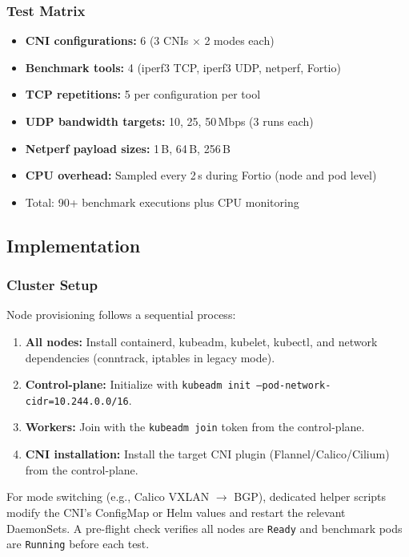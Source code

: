 \documentclass[11pt,a4paper]{article}
\begin{document}
\subsubsection{Test Matrix}

\begin{itemize}[nosep]
  \item \textbf{CNI configurations:} 6 (3 CNIs $\times$ 2 modes each)
  \item \textbf{Benchmark tools:} 4 (iperf3 TCP, iperf3 UDP, netperf, Fortio)
  \item \textbf{TCP repetitions:} 5 per configuration per tool
  \item \textbf{UDP bandwidth targets:} 10, 25, 50\,Mbps (3 runs each)
  \item \textbf{Netperf payload sizes:} 1\,B, 64\,B, 256\,B
  \item \textbf{CPU overhead:} Sampled every 2\,s during Fortio (node and pod level)
  \item Total: 90+ benchmark executions plus CPU monitoring
\end{itemize}

\subsection{Implementation}

\subsubsection{Cluster Setup}

Node provisioning follows a sequential process:
\begin{enumerate}
  \item \textbf{All nodes:} Install containerd, kubeadm, kubelet, kubectl, and network dependencies (conntrack, iptables in legacy mode).
  \item \textbf{Control-plane:} Initialize with \texttt{kubeadm init --pod-network-cidr=10.244.0.0/16}.
  \item \textbf{Workers:} Join with the \texttt{kubeadm join} token from the control-plane.
  \item \textbf{CNI installation:} Install the target CNI plugin (Flannel/Calico/Cilium) from the control-plane.
\end{enumerate}

For mode switching (e.g., Calico VXLAN $\to$ BGP), dedicated helper scripts modify the CNI's ConfigMap or Helm values and restart the relevant DaemonSets. A pre-flight check verifies all nodes are \texttt{Ready} and benchmark pods are \texttt{Running} before each test.
\end{document}
